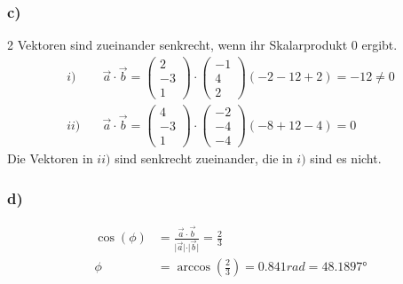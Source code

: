 \documentclass[a4paper,11pt]{article}
\begin{document}
  \subsubsection*{c)}
    2 Vektoren sind zueinander senkrecht, wenn ihr Skalarprodukt 0 ergibt.
    \begin{align*}
      i) \quad&\vec{a}\cdot\vec{b}=\begin{pmatrix}2\\-3\\1\end{pmatrix}\cdot\begin{pmatrix}-1\\4\\2\end{pmatrix}(-2-12+2)=-12\neq0 \\
      ii) \quad&\vec{a}\cdot\vec{b}=\begin{pmatrix}4\\-3\\1\end{pmatrix}\cdot\begin{pmatrix}-2\\-4\\-4\end{pmatrix}(-8+12-4)=0
    \end{align*}
    Die Vektoren in $ii)$ sind senkrecht zueinander, die in $i)$ sind es nicht.
  \subsubsection*{d)}
    \begin{align*}
      \cos(\phi)&=\frac{\vec{a}\cdot\vec{b}}{\vert\vec{a}\vert\cdot\vert\vec{b}\vert}=\frac{2}{3} \\
      \phi &= \arccos\left(\frac{2}{3}\right)=0.841rad=\ang{48.1897}
    \end{align*}
  
\end{document}
